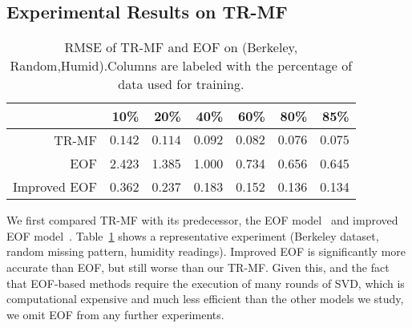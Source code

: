 \subsection{Experimental Results on TR-MF} \label{subsec:exp_basic}%



\begin{table}[h]
\vspace{-0.5cm}
\setlength{\tabcolsep}{2pt}
\centering
\caption{RMSE of TR-MF and EOF on (Berkeley, Random,Humid).\newline  Columns are labeled with the percentage of data used for training.}
\label{table:trmf_eof}
\scriptsize
\begin{tabular}{ r | r r r r r r}
		&10\%	&20\%	&40\%	&60\%	&80\% &85\%\\ 
	 \hline
	 TR-MF &$\mathbf{0.142}$ &$\mathbf{0.114}$ &$\mathbf{0.092}$ &$\mathbf{0.082}$ &$\mathbf{0.076}$  &$\mathbf{0.075}$\\
     	 EOF &2.423 &1.385 &1.000 &0.734 &0.656 &0.645\\
     Improved EOF & 0.362 & 0.237 & 0.183 & 0.152 & 0.136 & 0.134\\
\end{tabular}
\vspace{-0.5cm}
\end{table}


We first compared TR-MF with its predecessor, the EOF model~\cite{beckers2003eof} and improved EOF model~\cite{kondrashov2006spatio}.
Table~\ref{table:trmf_eof} shows a representative experiment (Berkeley dataset, random missing pattern, humidity readings).
Improved EOF is significantly more accurate than EOF, but still worse than our TR-MF.
Given this, and the fact that EOF-based methods require the execution of many rounds of SVD, 
which is computational expensive and much less efficient than the other models we study, 
we omit EOF from any further experiments.

